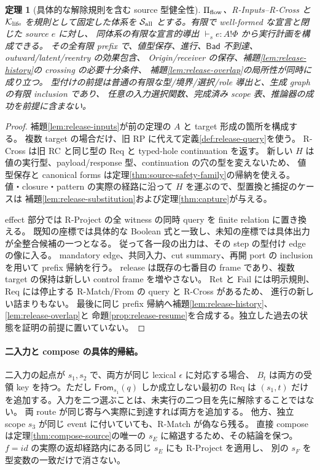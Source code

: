 \documentclass[11pt,a4paper]{article}
\newtheorem{theorem}[definition]{定理}
\newcommand{\Bad}{\mathsf{Bad}}
\newcommand{\Core}{\mathcal K}
\newcommand{\Src}{\mathcal S}
\begin{document}
\begin{theorem}[具体的な解除規則を含む source 型健全性]
\label{thm:release-source}
\(\Pi_{\rm flow}\)、R-Inputs--R-Cross と \(\Core_{\rm life}\) を規則として固定した体系を
\(\Src_{\rm all}\) とする。有限で well-formed な宣言と閉じた source \(e\) に対し、
同体系の有限な宣言的導出 \(\vdash_s e:A!\Phi\) から実行計画を構成できる。
その全有限 prefix で、値型保存、進行、\(\Bad\) 不到達、outward/latent/reentry の効果包含、
Origin/receiver の保存、補題\ref{lem:release-history}の crossing の必要十分条件、
補題\ref{lem:release-overlap}の局所性が同時に成り立つ。
型付けの前提は普通の有限な型/境界/選択/role 導出と、生成 graph の有限 inclusion であり、
任意の入力選択関数、完成済み scope 表、推論器の成功を前提に含まない。
\end{theorem}
\begin{proof}
補題\ref{lem:release-inputs}が前の定理の \(A\) と target 形成の箇所を構成する。
複数 target の場合だけ、旧 RP に代えて定義\ref{def:release-query}を使う。
R-Cross は旧 RC と同じ型の Req と typed-hole continuation を返す。
新しい \(H\) は値の実行型、payload/response 型、continuation の穴の型を変えないため、
値型保存と canonical forms は定理\ref{thm:source-safety-family}の帰納を使える。
値・closure・pattern の実際の経路に沿って \(H\) を運ぶので、型置換と捕捉のケースは
補題\ref{lem:release-substitution}および定理\ref{thm:capture}が与える。

effect 部分では R-Project の全 witness の同時 query を finite relation に置き換える。
既知の座標では具体的な Boolean 式と一致し、未知の座標では具体出力が全整合候補の一つとなる。
従って各一段の出力は、その step の型付け edge の像に入る。
mandatory edge、共同入力、cut summary、再開 port の inclusion を用いて prefix 帰納を行う。
release は既存の七番目の frame であり、複数 target の保持は新しい control frame を増やさない。
Ret と Fail には明示規則、Req には停止する R-Match/From の query と R-Cross があるため、
進行の新しい詰まりもない。
最後に同じ prefix 帰納へ補題\ref{lem:release-history}、\ref{lem:release-overlap}と
命題\ref{prop:release-resume}を合成する。独立した過去の状態を証明の前提に置いていない。
\end{proof}

\paragraph{二入力と compose の具体的帰結。}
二入力の起点が \(s_1,s_2\) で、両方が同じ lexical \(\epsilon\) に対応する場合、
\(B_t\) は両方の受領 key を持つ。ただし \(\mathsf{From}_{s_1}(q)\) しか成立しない最初の Req は
\((s_1,t)\) だけを追加する。入力を二つ選ぶことは、未実行の二つ目を先に解除することではない。
両 route が同じ寄与へ実際に到達すれば両方を追加する。
他方、独立 scope \(s_3\) が同じ event に付いていても、R-Match が偽なら残る。
直接 compose は定理\ref{thm:compose-source}の唯一の \(s_E\) に縮退するため、その結論を保つ。
\(f=id\) の実際の返却経路内にある同じ \(s_E\) にも R-Project を適用し、
別の \(s_F\) を型変数の一致だけで消さない。
\end{document}
